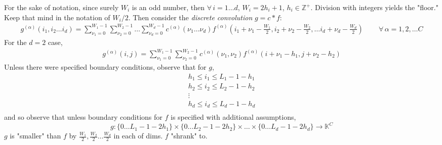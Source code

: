 \documentclass[10pt]{amsart}
\begin{document}
\begin{multicols*}{2}
For the sake of notation, since surely $W_i$ is an odd number, then $\forall \, i = 1\dots d$, $W_i = 2h_i + 1$, $h_i \in \mathbb{Z}^+$.  Division with integers yields the "floor."  Keep that mind in the notation of $W_i/2$.  
Then consider the \emph{discrete convolution} $g=c*f$: 
\begin{equation}\label{Eq:DiscreteConvolution}
\begin{gathered}
g^{(\alpha)}(i_1, i_2 \dots i_d) = \sum_{\nu_1=0}^{W_1-1} \sum_{\nu_2=0}^{W_2-1} \dots \sum_{\nu_d=0}^{W_d-1} c^{(\alpha)}(\nu_1 \dots \nu_d ) f^{(\alpha)}(i_1 + \nu_1 - \frac{W_1}{2} , i_2 + \nu_2 - \frac{W_2}{2}, \dots i_d + \nu_d - \frac{W_d}{2}) \qquad \, \forall \, \alpha = 1, 2, \dots C
\end{gathered}
\end{equation}
For the $d=2$ case, 
\[
\begin{gathered}
g^{(\alpha)}(i,j) = \sum_{\nu_1=0}^{W_1-1}\sum_{\nu_2=0}^{W_2-1} c^{(\alpha)}(\nu_1, \nu_2)f^{(\alpha)}(i+\nu_1 - h_1, j +\nu_2 - h_2)
\end{gathered}
\]
Unless there were specified boundary conditions, observe that for $g$, 
\[
\begin{gathered}
h_1 \leq i_1 \leq L_1 - 1 - h_1 \\
h_2 \leq i_2 \leq L_2 - 1 - h_2 \\
\vdots \\ 
h_d \leq i_d \leq L_d - 1 - h_d \\
\end{gathered}
\]
and so observe that unless boundary conditions for $f$ is specified with additional assumptions, 
\begin{equation}
g:\lbrace 0 \dots L_1 -1 - 2h_1 \rbrace \times \lbrace 0 \dots L_2 -1 - 2h_2 \rbrace \times \dots \times \lbrace 0 \dots L_d -1 - 2h_d \rbrace  \to \mathbb{K}^C
\end{equation}
$g$ is "smaller" than $f$ by $\frac{W_1}{2} , \frac{W_2}{2} \dots \frac{W_d}{2}$ in each of dims. $f$ "shrank" to.  

\end{multicols*}
\end{document}
